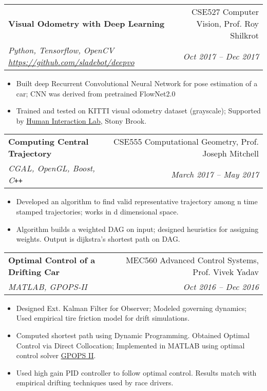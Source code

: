 \documentclass[letterpaper,10pt]{article}
\makeatletter
\newcommand{\resumeHeading}[4]{
  \vspace{-1pt}
    \begin{tabular*}{0.97\textwidth}{l@{\extracolsep{\fill}}r}
      \textbf{#1} & #2 \vspace{-2pt}\\ \vspace{1pt}
      \textit{\small#3} & \textit{\small #4} \\
    \end{tabular*}
}
\newcommand{\resumeItemListStart}{
\vspace{-7pt}
\begin{itemize}[leftmargin=14pt]
}
\newcommand{\resumeItemListEnd}{
\vspace{+7pt}
\end{itemize}
}
\newcommand{\resumeItem}[1]{
  \item\small{
      {#1 \vspace{-7pt}
      }
  }
}
\makeatother
\begin{document}
    \resumeHeading{Visual Odometry with Deep Learning}{CSE527 Computer Vision, Prof. Roy Shilkrot} {Python, Tensorflow, OpenCV \href{https://github.com/sladebot/deepvo}{https://github.com/sladebot/deepvo}}{Oct 2017 -- Dec 2017}
    \resumeItemListStart
      \resumeItem{Built deep Recurrent Convolutional Neural Network for pose estimation of a car; CNN was derived from pretrained FlowNet2.0}
      \resumeItem{Trained and tested on KITTI visual odometry dataset (grayscale); Supported by \href{http://hi.cs.stonybrook.edu/}{Human Interaction Lab}, Stony Brook.}
    \resumeItemListEnd


    \resumeHeading{Computing Central Trajectory}{CSE555 Computational Geometry, Prof. Joseph Mitchell}{CGAL, OpenGL, Boost, C\texttt{++}}{March 2017 -- May 2017}
    \resumeItemListStart
      \resumeItem{Developed an algorithm to find valid representative trajectory among n time stamped trajectories; works in d dimensional space.}
      \resumeItem{Algorithm builds a weighted DAG on input; designed heuristics for assigning weights. Output is dijkstra's shortest path on DAG.}
    \resumeItemListEnd
    \vspace{-10pt}

    \resumeHeading{Optimal Control of a Drifting Car}{MEC560 Advanced Control Systems, Prof. Vivek Yadav}{MATLAB, GPOPS-II}{Oct 2016 -- Dec 2016}
    \resumeItemListStart
      \resumeItem{Designed Ext. Kalman Filter for Observer; Modeled governing dynamics; Used empirical tire friction model for drift simulations.}
      \resumeItem{Computed shortest path using Dynamic Programming. Obtained Optimal Control via Direct Collocation; Implemented in MATLAB using optimal control solver \href{http://www.gpops2.com/}{GPOPS II}.}
      \resumeItem{Used high gain PID controller to follow optimal control. Results match with empirical drifting techniques used by race drivers.}
    \resumeItemListEnd
\end{document}
